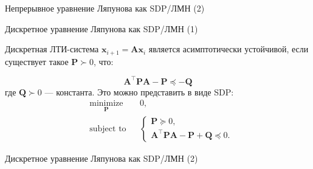 \documentclass{beamer}
\begin{document}
\begin{frame}{Непрерывное уравнение Ляпунова как SDP/ЛМН (2)}
	\begin{flushleft}
		
		
		
	\end{flushleft}
\end{frame}

\begin{frame}{Дискретное уравнение Ляпунова как SDP/ЛМН (1)}
	\begin{flushleft}
		
		Дискретная ЛТИ-система $\mathbf{x}_{i+1} = \mathbf{A}\mathbf{x}_i$ является асимптотически устойчивой, если существует такое $\mathbf{P} \succ 0$, что: 
		
		\begin{equation}
			\mathbf{A}^\top \mathbf{P}\mathbf{A} - \mathbf{P}  \preceq - \mathbf{Q}
		\end{equation}
		где $\mathbf{Q} \succ 0$ — константа. Это можно представить в виде SDP:
		\begin{equation}
			\begin{aligned}
				& \underset{\mathbf{P}}{\text{minimize}}
				& & 0, \\
				& \text{subject to}
				& & \begin{cases}
					\mathbf{P} \succeq 0, \\
					\mathbf{A}^\top \mathbf{P}\mathbf{A} - \mathbf{P} + \mathbf{Q} \preceq 0.
				\end{cases}
			\end{aligned}
		\end{equation}
		
	\end{flushleft}
\end{frame}

\begin{frame}{Дискретное уравнение Ляпунова как SDP/ЛМН (2)}
	\begin{flushleft}
		
		
		
	\end{flushleft}
\end{frame}
\end{document}
